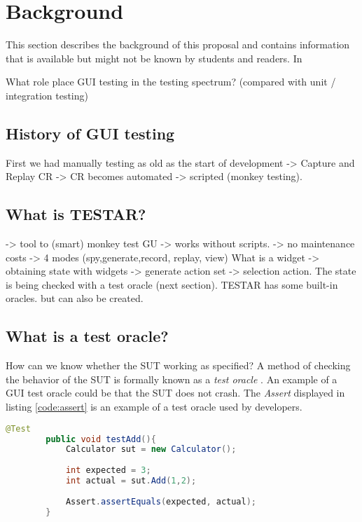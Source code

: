 \section{Background} \label{background}
    This section describes the background of this proposal and contains information that is available but might not be known by students and readers. In
    
    What role place GUI testing in the testing spectrum? (compared with unit / integration testing)

\subsection{History of GUI testing}


    First we had manually testing as old as the start of development -> Capture and Replay CR -> CR becomes automated -> scripted (monkey testing).

\subsection{What is TESTAR?}
    -> tool to (smart) monkey test GU -> works without scripts. -> no maintenance costs -> 4 modes (spy,generate,record, replay, view)
    What is a widget -> obtaining state with widgets -> generate action set -> selection action.
    The state is being checked with a test oracle (next section). TESTAR has some built-in oracles. but can also be created.



\subsection{What is a test oracle?}
    How can we know whether the SUT working as specified? A method of checking the behavior of the SUT is formally known as a \textit{test oracle} \cite{testOracles}. An example of a GUI test oracle could be that the SUT does not crash. The \textit{Assert} displayed in listing \ref{code:assert} is an example of a test oracle used by developers.

    \begin{lstlisting}[language=Java, caption=Assertion, label=code:assert]
        @Test
        public void testAdd(){
            Calculator sut = new Calculator();
        
            int expected = 3;
            int actual = sut.Add(1,2);
        
            Assert.assertEquals(expected, actual);
        }
    \end{lstlisting}
    
